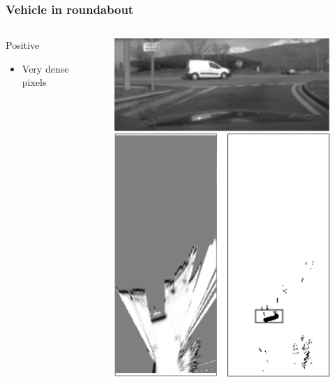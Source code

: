 \documentclass{beamer}
\begin{document}
	\begin{frame}
		\frametitle{Vehicle in roundabout}
		\begin{columns}[t]
			\begin{column}[t]{5cm}
				\begin{exampleblock}{Positive}
				\begin{itemize}
				\item Very dense pixels
				\end{itemize}
				\end{exampleblock}
			\end{column}
			\begin{column}[t]{5cm}
				\begin{figure}[h]
				\center
				\includegraphics[scale=0.55]{../img/fig:result:scenetwocarrondepoint}
				\end{figure}
			\end{column}
		\end{columns}
	\end{frame}
\end{document}
